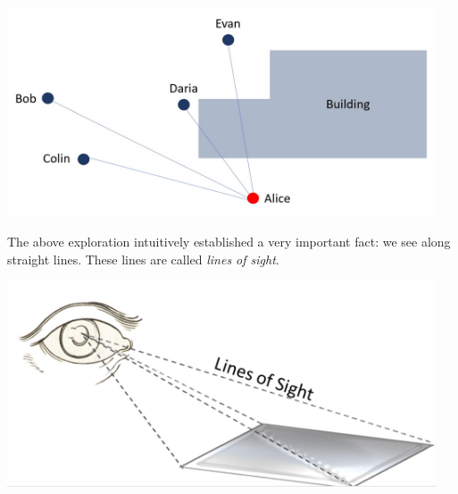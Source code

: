 \documentclass{ximera}
\begin{document}
\begin{exploration}
\begin{expandable}
    \begin{image}
         \includegraphics[width=5in]{hideAndSeek2.jpg}
\end{image}
\end{expandable}
\end{exploration}

The above exploration intuitively established a very important fact: we see along straight lines.  These lines are called \emph{lines of sight}.
\begin{image}
         \includegraphics[width=5in]{linesOfSight.jpg}
\end{image}
\end{document}
